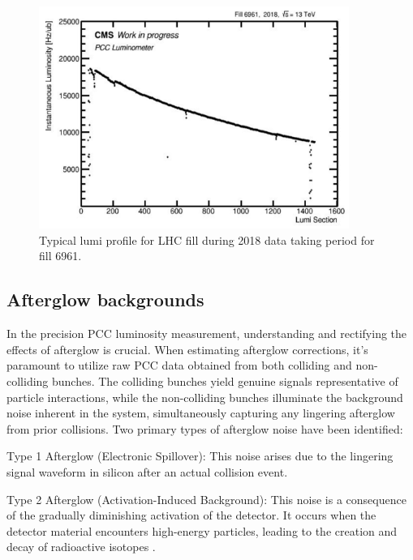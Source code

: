 \begin{figure}[!htp]
    \centering
    \includegraphics[width=0.9\textwidth]{ashish_thesis/Fill_profile_6961_1.png}
    \caption[fill 6961 profile]{Typical lumi profile for LHC fill during 2018 data taking period for fill 6961.}
    \label{fig:Fill6961}
\end{figure}


\newpage
\subsection{Afterglow backgrounds}

In the precision PCC luminosity measurement, understanding and rectifying the effects of afterglow is crucial. When estimating afterglow corrections, it's paramount to utilize raw PCC data obtained from both colliding and non-colliding bunches. The colliding bunches yield genuine signals representative of particle interactions, while the non-colliding bunches illuminate the background noise inherent in the system, simultaneously capturing any lingering afterglow from prior collisions. Two primary types of afterglow noise have been identified:

Type 1 Afterglow (Electronic Spillover): This noise arises due to the lingering signal waveform in silicon after an actual collision event.

Type 2 Afterglow (Activation-Induced Background): This noise is a consequence of the gradually diminishing activation of the detector. It occurs when the detector material encounters high-energy particles, leading to the creation and decay of radioactive isotopes \cite{CMS-PAS-SMP-12-008}. %

